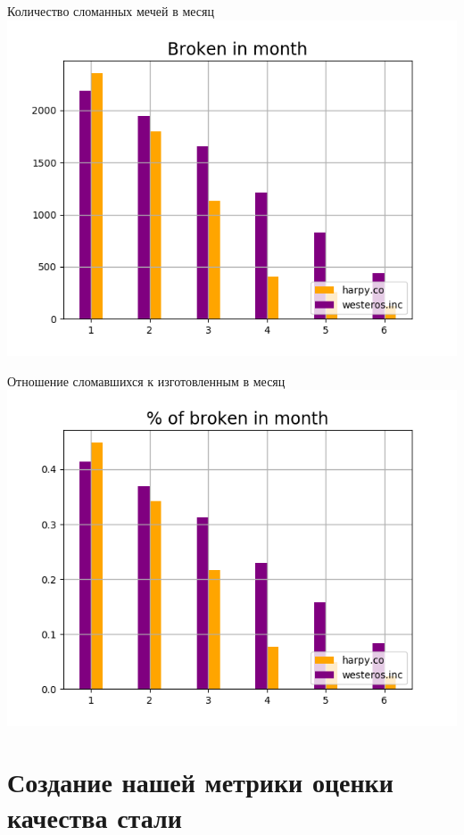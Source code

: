 \documentclass{beamer}
\begin{document}
\begin{frame}{Количество сломанных мечей в месяц}
    \includegraphics[scale = 0.7]{Figure_2.png}
\end{frame}

\begin{frame}{Отношение сломавшихся к изготовленным в месяц}
    \includegraphics[scale = 0.7]{Figure_3.png}
\end{frame}

\section{Создание нашей метрики оценки качества стали}
\end{document}
